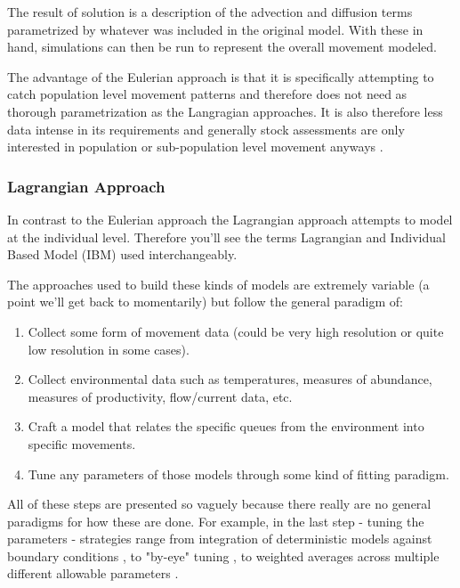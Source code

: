 \documentclass[11pt]{article}
\begin{document}
The result of solution is a description of the advection and diffusion terms parametrized by whatever was included in the original model. With these in hand, simulations can then be run to represent the overall movement modeled.

The advantage of the Eulerian approach is that it is specifically attempting to catch population level movement patterns and therefore does not need as thorough parametrization as the Langragian approaches. It is also therefore less data intense in its requirements and generally stock assessments are only interested in population or sub-population level movement anyways \cite{lehodey2008}. 


\subsubsection{Lagrangian Approach}

In contrast to the Eulerian approach the Lagrangian approach attempts to model at the individual level. Therefore you'll see the terms Lagrangian and Individual Based Model (IBM) used interchangeably. 

The approaches used to build these kinds of models are extremely variable \cite{grimm} (a point we'll get back to momentarily) but follow the general paradigm of:

\begin{enumerate}
\item Collect some form of movement data (could be very high resolution or quite low resolution in some cases).
\item Collect environmental data such as temperatures, measures of abundance, measures of productivity, flow/current data, etc.
\item Craft a model that relates the specific queues from the environment into specific movements.
\item Tune any parameters of those models through some kind of fitting paradigm.
\end{enumerate}

All of these steps are presented so vaguely because there really are no general paradigms for how these are done. For example, in the last step - tuning the parameters - strategies range from integration of deterministic models against boundary conditions \cite{phillipsa2018}, to "by-eye" tuning \cite{goodwin2006}, to weighted averages across multiple different allowable parameters \cite{burke2016}. \newline
\end{document}
